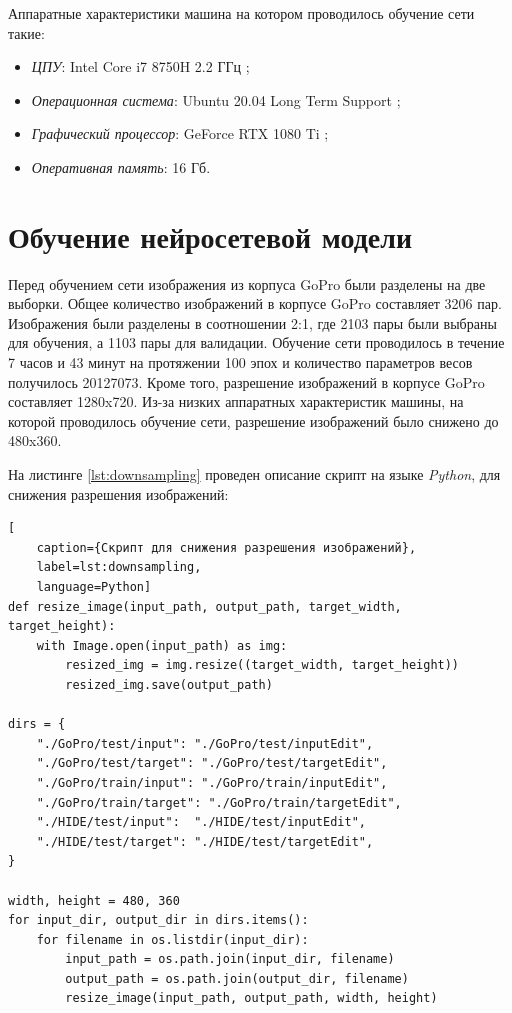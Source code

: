 Аппаратные характеристики машина на котором проводилось обучение сети такие:

\begin{itemize}
    \item \textit{ЦПУ}: Intel Core i7 8750H 2.2 ГГц \cite{intel_core_i7_8750h};
    \item \textit{Операционная система}: Ubuntu 20.04 Long Term Support \cite{ubuntu2004};
    \item \textit{Графический процессор}: GeForce RTX 1080 Ti \cite{geforce_gtx_1080_ti};
    \item \textit{Оперативная память}: 16 Гб.
\end{itemize}

\section{Обучение нейросетевой модели}

Перед обучением сети изображения из корпуса GoPro \cite{nah2017deep} были разделены на две выборки. Общее количество изображений в корпусе GoPro составляет 3206 пар. Изображения были разделены в соотношении 2:1, где 2103 пары были выбраны для обучения, а 1103 пары для валидации. Обучение сети проводилось в течение 7 часов и 43 минут на протяжении 100 эпох и количество параметров весов получилось 20127073. Кроме того, разрешение изображений в корпусе GoPro составляет 1280x720. Из-за низких аппаратных характеристик машины, на которой проводилось обучение сети, разрешение изображений было снижено до 480x360.

На листинге \ref{lst:downsampling} проведен описание скрипт на языке \textit{Python}, для снижения разрешения изображений:
\begin{lstlisting}[
	caption={Скрипт для снижения разрешения изображений},
	label=lst:downsampling,
	language=Python]
def resize_image(input_path, output_path, target_width, target_height):
    with Image.open(input_path) as img:
        resized_img = img.resize((target_width, target_height))
        resized_img.save(output_path)

dirs = {
    "./GoPro/test/input": "./GoPro/test/inputEdit",
    "./GoPro/test/target": "./GoPro/test/targetEdit",
    "./GoPro/train/input": "./GoPro/train/inputEdit",
    "./GoPro/train/target": "./GoPro/train/targetEdit",
    "./HIDE/test/input":  "./HIDE/test/inputEdit",
    "./HIDE/test/target": "./HIDE/test/targetEdit",
}

width, height = 480, 360
for input_dir, output_dir in dirs.items():
    for filename in os.listdir(input_dir):
        input_path = os.path.join(input_dir, filename)
        output_path = os.path.join(output_dir, filename)
        resize_image(input_path, output_path, width, height)
\end{lstlisting}

